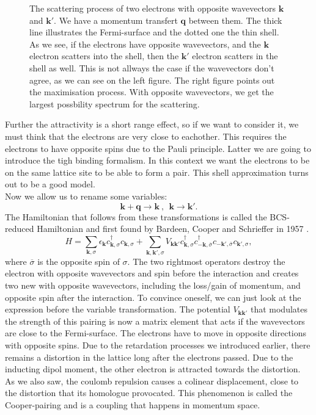\documentclass[../main.tex]{subfile}
\begin{document}
\begin{figure}[H]
    \caption{The scattering process of two electrons with opposite wavevectors $\bm{k}$ and $\bm{k}'$. We have a momentum transfert $\bm{q}$ between them. 
    The thick line illustrates the Fermi-surface and the dotted one the thin shell. As we see, if the electrons have opposite wavevectors, and the $\bm{k}$ electron
    scatters into the shell, then the $\bm{k}'$ electron scatters in the shell as well. This is not allways the case if the wavevectors don't agree, as we can see on the left figure.
    The right figure points out the maximisation process. With opposite wavevectors,
    we get the largest possbility spectrum for the scattering.}
\end{figure}
Further the attractivity is a short range effect, so if we want to consider it, we must think that the electrons are very close to eachother.
This requires the electrons to have opposite spins due to the Pauli principle. Latter we are going to introduce the tigh binding formalism. In this context we want
the electrons to be on the same lattice site to be able to form a pair. This shell approximation turns out to be a good model.\\

Now we allow us to rename some variables:
\[
    \bm{k} + \bm{q} \longrightarrow \bm{k} ~,~~ \bm{k} \longrightarrow \bm{k}'.
\]
The Hamiltonian that follows from these transformations is called the BCS-reduced Hamiltonian and first found by Bardeen, Cooper and Schrieffer in 1957 \cite{BCS1957}.
\begin{equation} \label{eq:BCS_ReducedHamiltonian}
    H = \sum_{\bm{k},\sigma} \epsilon_{\bm{k}} c_{\bm{k},\sigma}^{\dagger}c_{\bm{k},\sigma} +
     \sum_{\bm{k},\bm{k}',\sigma} V_{\bm{k}\bm{k}'} c_{\bm{k},\sigma}^{\dagger}c_{-\bm{k},\overline{\sigma}}^{\dagger}c_{-\bm{k}',\overline{\sigma}}c_{\bm{k}',\sigma},
\end{equation}
where $\overline{\sigma}$ is the opposite spin of $\sigma$. 
The two rightmost operators destroy the electron with opposite wavevectors and spin before the interaction and creates two new with opposite wavevectors, including the
 loss/gain of momentum, and opposite spin after the interaction. To convince oneself, we can just look at the expression before the variable transformation. The potential $V_{\bm{k}\bm{k}'}$ 
 that modulates the strength of this pairing is now a matrix element that acts if the wavevectors are close to the Fermi-surface. The electrons have to move in opposite directions with opposite spins.
Due to the retardation processes we introduced earlier, there remains a distortion in the lattice long after the electrons passed. Due to the inducting dipol moment,
the other electron is attracted towards the distortion. As we also saw, the coulomb repulsion causes a colinear displacement, close to the distortion
that its homologue provocated. This phenomenon is called the Cooper-pairing and is a coupling that happens in momentum space.\\
\end{document}
